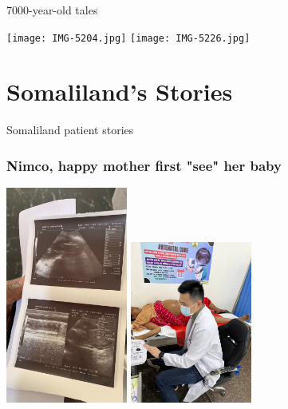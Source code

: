 \documentclass[aspectratio=169]{beamer}
\begin{document}
\begin{frame}{7000-year-old tales}
    \begin{center}
        \texttt{[image: IMG-5204.jpg]}
        \texttt{[image: IMG-5226.jpg]}

    \end{center}

\end{frame}


\section{Somaliland's Stories}

\begin{frame}{Somaliland patient stories}
    \begin{center}
     
     

\end{center}
\end{frame}

\begin{frame}
\frametitle{Nimco, happy mother first "see" her baby}
\begin{center}
    \includegraphics[width=0.3\textwidth, trim=00mm 100mm 00mm 60mm,clip]{IMG-5117.JPG} 
    \includegraphics[width=0.3\textwidth, trim=60mm 60mm 30mm 60mm,clip]{52165_antenatal_check.jpg}

\end{center}
\end{frame}
\end{document}
